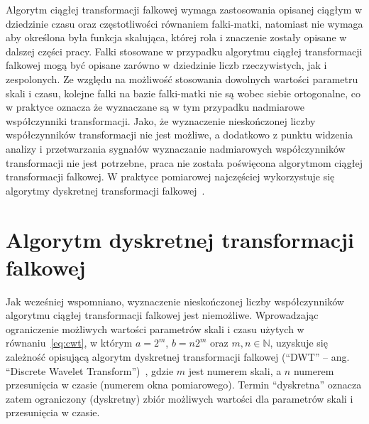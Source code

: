 Algorytm ciągłej transformacji falkowej wymaga zastosowania opisanej ciągłym w dziedzinie czasu oraz częstotliwości równaniem falki-matki, natomiast nie wymaga aby określona była funkcja skalująca, której rola i znaczenie zostały opisane w dalszej części pracy. Falki stosowane w przypadku algorytmu ciągłej transformacji falkowej mogą być opisane zarówno w dziedzinie liczb rzeczywistych, jak i zespolonych. Ze względu na możliwość stosowania dowolnych wartości parametru skali i czasu, kolejne falki na bazie falki-matki nie są wobec siebie ortogonalne, co w praktyce oznacza że wyznaczane są w tym przypadku nadmiarowe współczynniki transformacji. Jako, że wyznaczenie nieskończonej liczby współczynników transformacji nie jest możliwe, a dodatkowo z punktu widzenia analizy i przetwarzania sygnałów wyznaczanie nadmiarowych współczynników transformacji nie jest potrzebne, praca nie została poświęcona algorytmom ciągłej transformacji falkowej. W praktyce pomiarowej najczęściej wykorzystuje się algorytmy dyskretnej transformacji falkowej~\cite{wallen_handbook, akujuobi_applications}.

\section{Algorytm dyskretnej transformacji falkowej}

Jak wcześniej wspomniano, wyznaczenie nieskończonej liczby współczynników algorytmu ciągłej transformacji falkowej jest niemożliwe. Wprowadzając ograniczenie możliwych wartości parametrów skali i czasu użytych w równaniu~\eqref{eq:cwt}, w którym $a = 2^m$, $b = n2^m$ oraz $m, n \in \mathbb{N}$, uzyskuje się zależność opisującą algorytm dyskretnej transformacji falkowej (\enquote{DWT} -- ang. \enquote{Discrete Wavelet Transform})~\cite{wallen_handbook}, gdzie $m$ jest numerem skali, a $n$ numerem przesunięcia w czasie (numerem okna pomiarowego). Termin \enquote{dyskretna} oznacza zatem ograniczony (dyskretny) zbiór możliwych wartości dla parametrów skali i przesunięcia w czasie.

